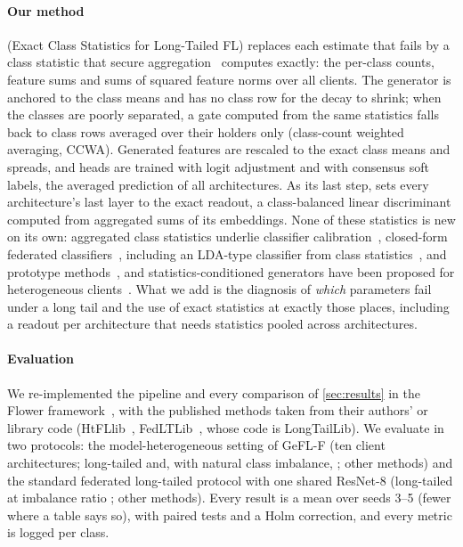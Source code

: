 \paragraph{Our method} \ours (Exact Class Statistics for Long-Tailed FL) replaces each estimate that fails by a class
statistic that secure aggregation~\cite{bonawitz2017secagg,bell2020secaggplus} computes exactly: the per-class
counts, feature sums and sums of squared feature norms over all clients. The generator is anchored to the class means
and has no class row for the decay to shrink; when the classes are poorly separated, a gate computed from the same
statistics falls back to class rows averaged over their holders only (class-count weighted averaging, CCWA).
Generated features are rescaled to the exact class means and spreads, and heads are trained with logit adjustment and
with consensus soft labels, the averaged prediction of all architectures. As its last step, \ours sets every
architecture's last layer to the exact readout, a class-balanced linear discriminant computed from aggregated sums of
its embeddings. None of these statistics is new on its own: aggregated class
statistics underlie classifier calibration~\cite{luo2021ccvr}, closed-form federated
classifiers~\cite{fani2024fed3r,legate2023fedncm,goswami2025fedcof}, including an LDA-type classifier from class
statistics~\cite{goswami2025fedcof}, and prototype methods~\cite{tan2022fedproto}, and statistics-conditioned
generators have been proposed for heterogeneous clients~\cite{niu2026fedvtc}. What we add is the diagnosis of
\emph{which} parameters fail under a long tail and the use of exact statistics at exactly those places, including a
readout per architecture that needs statistics pooled across architectures.

\paragraph{Evaluation} We re-implemented the pipeline and every comparison of \cref{sec:results} in the Flower framework~\cite{beutel2020flower},
with the published methods taken from their authors' or library code (HtFLlib~\cite{zhang2025htfllib},
FedLTLib~\cite{lin2026fedltlib}, whose code is LongTailLib). We evaluate in two protocols: the model-heterogeneous setting of
GeFL-F (ten client architectures; long-tailed  and, with natural class imbalance,
;  other methods) and the standard federated long-tailed protocol with one
shared ResNet-8 (long-tailed  at imbalance ratio ;  other methods). Every
result is a mean over seeds 3--5 (fewer where a table says so), with paired tests and a Holm correction, and every
metric is logged per class.

